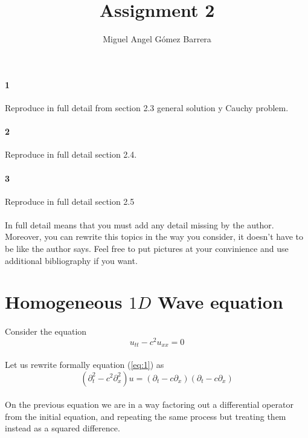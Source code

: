 \documentclass{article}
\title{Assignment 2}
\author{Miguel Angel Gómez Barrera}
\begin{document}
	\maketitle
\paragraph{1} Reproduce in full detail from section 2.3 general solution y Cauchy problem. 
\paragraph{2} Reproduce in full detail section 2.4.
\paragraph{3} Reproduce in full detail section 2.5
\paragraph{} In full detail means that you must add any detail missing by the author. Moreover, you can rewrite this topics in the way you consider, it doesn’t have to be like the author says. Feel free to put pictures at your convinience and use additional bibliography if you want.

\section{Homogeneous $1D$ Wave equation}
\paragraph{}Consider the equation
\begin{equation}
u_{tt} - c^2u_{xx} = 0\label{eq:1}
\end{equation}
\paragraph{} Let us rewrite formally equation (\ref{eq:1}) as
\begin{equation}
(\partial^2_t - c^2 \partial^2_x)u = (\partial_t - c\partial_x) (\partial_t - c\partial_x)\label{eq:2}
\end{equation}
\paragraph{}On the previous equation we are in a way factoring out a differential operator from the initial equation, and repeating the same process but treating them instead as a squared difference.
\end{document}
